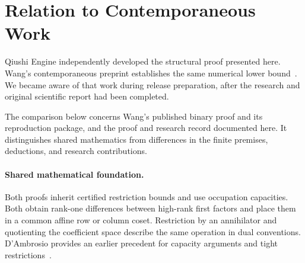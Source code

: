 \section{Relation to Contemporaneous Work}\label{app:comparison}

Qiushi Engine independently developed the structural proof presented here.
Wang's contemporaneous preprint establishes the same numerical lower
bound~\cite{wang2026twentyone}. We became aware of that work during release
preparation, after the research and original scientific report had been completed.

The comparison below concerns Wang's published binary proof and its
reproduction package, and the proof and research record documented here.
It distinguishes shared mathematics from differences in the finite
premises, deductions, and research contributions.

\paragraph{Shared mathematical foundation.}
Both proofs inherit certified restriction bounds and use occupation
capacities. Both obtain rank-one differences between high-rank first
factors and place them in a common affine row or column coset. Restriction
by an annihilator and quotienting the coefficient space describe the same
operation in dual conventions. D'Ambrosio provides an earlier precedent
for capacity arguments and tight restrictions~\cite{dambrosio2026}.

